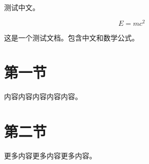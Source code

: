 \documentclass[12pt,a4paper]{article}
\begin{document}
测试中文。

\begin{equation}
E = mc^2
\end{equation}

这是一个测试文档。包含中文和数学公式。

\section{第一节}
内容内容内容内容内容。

\section{第二节}
更多内容更多内容更多内容。
\end{document}
